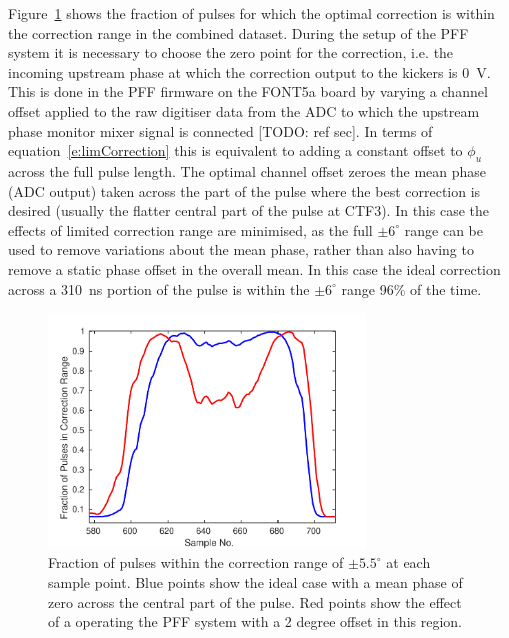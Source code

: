 Figure~\ref{f:longFF_fractInRange} shows the fraction of pulses for which the optimal correction is within the correction range in the combined dataset. During the setup of the PFF system it is necessary to choose the zero point for the correction, i.e. the incoming upstream phase at which the correction output to the kickers is 0~V. This is done in the PFF firmware on the FONT5a board by varying a channel offset applied to the raw digitiser data from the ADC to which the upstream phase monitor mixer signal is connected [TODO: ref sec]. In terms of equation~\ref{e:limCorrection} this is equivalent to adding a constant offset to \(\phi_u\) across the full pulse length. The optimal channel offset zeroes the mean phase (ADC output) taken across the part of the pulse where the best correction is desired (usually the flatter central part of the pulse at CTF3). In this case the effects of limited correction range are minimised, as the full \(\pm6^\circ\) range can be used to remove variations about the mean phase, rather than also having to remove a static phase offset in the overall mean. In this case the ideal correction across a 310~ns portion of the pulse is within the \(\pm6^\circ\) range 96\% of the time.

\begin{figure}
  \centering
  \includegraphics[width=0.75\textwidth]{Figures/feedforward/longFF_fractInRange}
  \caption{Fraction of pulses within the correction range of \(\pm 5.5^\circ\) at each sample point. Blue points show the ideal case with a mean phase of zero across the central part of the pulse. Red points show the effect of a operating the PFF system with a 2 degree offset in this region.}
  \label{f:longFF_fractInRange}
\end{figure}

